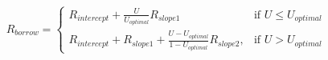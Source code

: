 \documentclass[preview]{standalone}
\begin{document}
\begin{align*}
R_{borrow} = \begin{cases} R_{intercept} + \frac{U}{U_{optimal}}R_{slope1} & \text{if } U \leq U_{optimal} \\ R_{intercept} + R_{slope1} + \frac{U-U_{optimal}}{1-U_{optimal}}R_{slope2}, & \text{if } U > U_{optimal} \end{cases}
\end{align*}
\end{document}
